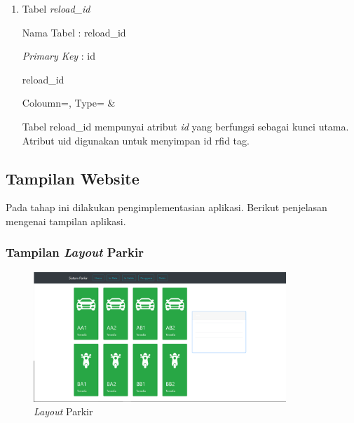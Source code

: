 \begin{enumerate}[topsep=0pt,itemsep=0pt,partopsep=0pt, parsep=0pt]
    \item Tabel \textit{reload\_id}

    Nama Tabel : reload\_id

    \textit{Primary Key} : id

    \begin{table} [H]
        \centering
        \caption{reload\_id}
        \label{table:db_reload_id}
            {
                Coloumn=\Coloumn, 
                Type=\Type}
            {
                \Coloumn & 
                \Type}
    \end{table}

    Tabel reload\_id mempunyai atribut \textit{id} yang berfungsi sebagai kunci utama. Atribut uid digunakan untuk menyimpan id rfid tag.

\end{enumerate}

\subsection{Tampilan Website}
Pada tahap ini dilakukan pengimplementasian aplikasi. Berikut penjelasan mengenai tampilan aplikasi.

\subsubsection{Tampilan \textit{Layout} Parkir}
\begin{figure} [H]
    \includegraphics[width=0.85\textwidth, center]{images/web 1 layout parkir.png}
    \caption{\textit{Layout} Parkir}
    \label{fig:web1layout-parkir}
\end{figure}

